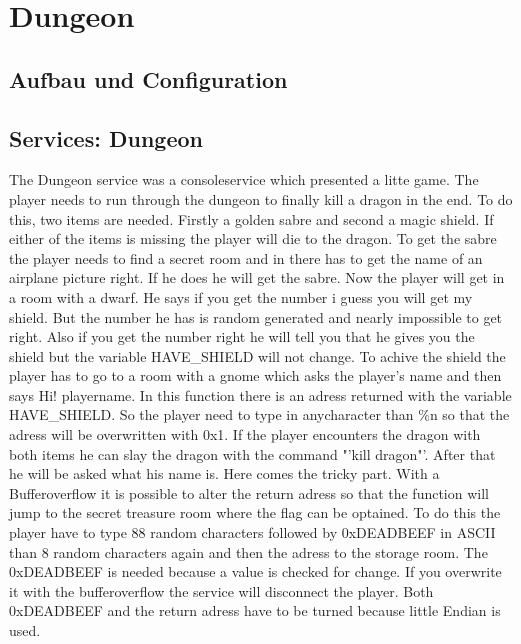 \chapter{Dungeon}


\section{Aufbau und Configuration}


\section{Services: Dungeon}
The Dungeon service was a consoleservice which presented a litte game. The player needs to run through the dungeon to finally kill a dragon in the end. To do this, two items are needed. Firstly a golden sabre and second a magic shield. If either of the items is missing the player will die to the dragon.
To get the sabre the player needs to find a secret room and in there has to get the name of an airplane picture right. If he does he will get the sabre. 
Now the player will get in a room with a dwarf. He says if you get the number i guess you will get my shield. But the number he has is random generated and nearly impossible to get right. Also if you get the number right he will tell you that he gives you the shield but the variable HAVE\_SHIELD will not change. To achive the shield the player has to go to a room with a gnome which asks the player's name and then says Hi! playername. In this function there is an adress returned with the variable HAVE\_SHIELD. So the player need to type in anycharacter than \%n so that the adress will be overwritten with 0x1.
If the player encounters the dragon with both items he can slay the dragon with the command "'kill dragon"'. After that he will be asked what his name is. Here comes the tricky part. With a Bufferoverflow it is possible to alter the return adress so that the function will jump to the secret treasure room where the flag can be optained. To do this the player have to type 88 random characters followed by 0xDEADBEEF in ASCII than 8 random characters again and then the adress to the storage room. The 0xDEADBEEF is needed because a value is checked for change. If you overwrite it with the bufferoverflow the service will disconnect the player. Both 0xDEADBEEF and the return adress have to be turned because little Endian is used. 


